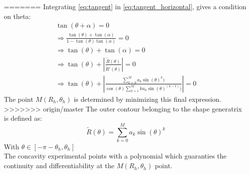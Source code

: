 =======
Integrating \eqref{eq:tangent} in \eqref{eq:tangent_horizontal}, gives a condition on theta:
	\begin{gather*}
		\tan(\theta+\alpha) =0\\
		\Rightarrow\frac{\tan(\theta)+\tan(\alpha)}{1-\tan(\theta)\tan(\alpha)} = 0\\
		\Rightarrow\tan(\theta)+\tan(\alpha) = 0\\
		\Rightarrow\tan(\theta)+|{\frac {\tilde{R}(\theta )}{\tilde{R}'(\theta )}}|=0\\
		\Rightarrow\tan(\theta)+|{\frac {\sum\limits_{k=0}^M a_k \sin(\theta)^k  )}{\cos(\theta) \sum\limits_{k=1}^M k a_k \sin(\theta)^{(k-1)} )}}|=0
	\end{gather*}
The point $M(R_{h},\theta_h)$ is determined by minimizing this final expression.\\
>>>>>>> origin/master
The outer contour belonging to the shape generatrix is defined as:
\begin{equation*}
	\tilde{R}(\theta) = \sum\limits_{k=0}^M a_k \sin(\theta)^k
\end{equation*}
With $\theta \in[-\pi-\theta_h,\theta_h]$\\
The concavity experimental points with a polynomial which guaranties the continuity and differentiability at the $M(R_{h},\theta_h)$ point.

